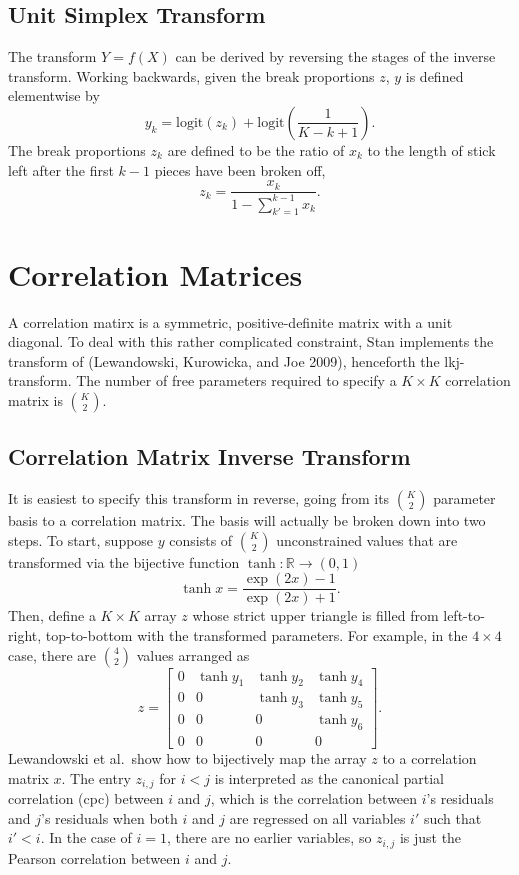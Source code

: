 \documentclass[10pt]{report}
\newcommand{\Stan}{Stan\xspace}
\newcommand{\acronym}[1]{{\sc #1}\xspace}
\newcommand{\LKJ}{\acronym{lkj}}
\newcommand{\CPC}{\acronym{cpc}}
\begin{document}
\subsection{Unit Simplex Transform}

The transform $Y = f(X)$ can be derived by reversing the stages of the
inverse transform.  Working backwards, given the break proportions
$z$, $y$ is defined elementwise by
%
\[
y_k 
= \mbox{logit}(z_k)
+ \mbox{logit}\left(
   \frac{1}{K-k+1}
   \right)
.
\]
%
The break proportions $z_k$ are defined to be the ratio of $x_k$ to
the length of stick left after the first $k-1$ pieces have been broken
off, 
%
\[
z_k 
= \frac{x_k}
       {1 - \sum_{k' = 1}^{k-1} x_k}
.
\]

\section{Correlation Matrices}

A correlation matirx is a symmetric, positive-definite matrix with a
unit diagonal.  To deal with this rather complicated constraint, \Stan
implements the transform of (Lewandowski, Kurowicka, and Joe 2009),
henceforth the \LKJ-transform.  The number of free parameters required
to specify a $K \times K$ correlation matrix is $K \choose 2$.

\subsection{Correlation Matrix Inverse Transform}

It is easiest to specify this transform in reverse, going from its $K
\choose 2$ parameter basis to a correlation matrix.  The basis will
actually be broken down into two steps.  To start, suppose $y$
consists of $K \choose 2$ unconstrained values that are transformed via
the bijective function $\tanh : \mathbb{R} \rightarrow (0,1)$ 
%
\[
\tanh x = \frac{\exp(2x) - 1}{\exp(2x) + 1}.
\]
%
Then, define a $K \times K$ array $z$ whose strict upper triangle is 
filled from left-to-right, top-to-bottom with the transformed parameters.
For example, in the $4 \times 4$ case, there are ${4 \choose 2}$ values
arranged as
%
\[
z 
=
\left[
\begin{array}{cccc}
0 & \tanh y_1 & \tanh y_2 & \tanh y_4
\\
0 & 0 & \tanh y_3 & \tanh y_5
\\
0 & 0 & 0 & \tanh y_6
\\
0 & 0 & 0 & 0
\end{array}
\right]
.
\]
%
Lewandowski et al.\ show how to bijectively map the array $z$ to a correlation
matrix $x$.  The entry $z_{i,j}$ for $i < j$ is interpreted as the
canonical partial correlation (\CPC) between $i$ and $j$, which is the
correlation between $i$'s residuals and $j$'s residuals when both $i$
and $j$ are regressed on all variables $i'$ such that $i'< i$.
In the case of $i=1$, there are no earlier variables, 
so $z_{i,j}$ is just the Pearson correlation between $i$ and $j$.
\end{document}
